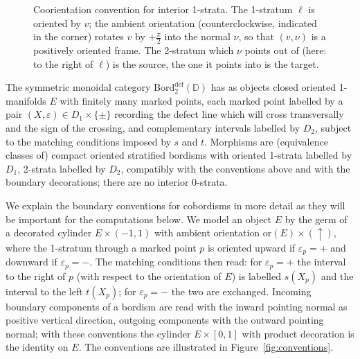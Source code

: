 \documentclass[11pt]{article}
\theoremstyle{definition}
\newcommand{\bD}{\mathbb{D}}
\newcommand{\Bord}{\mathrm{Bord}}
\begin{document}
\begin{figure}[ht]
\centering
{}
\caption{Coorientation convention for interior 1-strata. The 1-stratum $\ell$ is oriented by $v$; the ambient orientation (counterclockwise, indicated in the corner) rotates $v$ by $+\tfrac{\pi}{2}$ into the normal $\nu$, so that $(v,\nu)$ is a positively oriented frame. The 2-stratum which $\nu$ points out of (here: to the right of $\ell$) is the source, the one it points into is the target.}
\label{fig:coorientation}
\end{figure}

The symmetric monoidal category $\Bord_2^{\textrm{def}}(\bD)$ has as objects closed oriented 1-manifolds $E$ with finitely many marked points, each marked point labelled by a pair $(X,\varepsilon) \in D_1 \times \{\pm\}$ recording the defect line which will cross transversally and the sign of the crossing, and complementary intervals labelled by $D_2$, subject to the matching conditions imposed by $s$ and $t$. Morphisms are (equivalence classes of) compact oriented stratified bordisms with oriented 1-strata labelled by $D_1$, 2-strata labelled by $D_2$, compatibly with the conventions above and with the boundary decorations; there are no interior 0-strata.

We explain the boundary conventions for cobordisms in more detail as they will be important for the computations below. We model an object $E$ by the germ of a decorated cylinder $E \times (-1,1)$ with ambient orientation $\mathrm{or}(E) \times (\uparrow)$, where the 1-stratum through a marked point $p$ is oriented upward if $\varepsilon_p = +$ and downward if $\varepsilon_p = -$. The matching conditions then read: for $\varepsilon_p = +$ the interval to the right of $p$ (with respect to the orientation of $E$) is labelled $s(X_p)$ and the interval to the left $t(X_p)$; for $\varepsilon_p = -$ the two are exchanged. Incoming boundary components of a bordism are read with the inward pointing normal as positive vertical direction, outgoing components with the outward pointing normal; with these conventions the cylinder $E \times [0,1]$ with product decoration is the identity on $E$. The conventions are illustrated in Figure~\ref{fig:conventions}.
\end{document}
